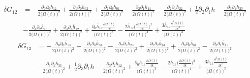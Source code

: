 \documentclass[10pt,letterpaper]{article}
\begin{document}
\begin{align}
	\delta G_{12} &=- \frac{\partial_{0}\partial_{0}\overline{h}_{12}}{2 \bigl(\Omega(t)\bigr)^2} + \frac{\partial_{1}\partial_{0}\overline{h}_{02}}{2 \bigl(\Omega(t)\bigr)^2} + \frac{\partial_{2}\partial_{0}\overline{h}_{01}}{2 \bigl(\Omega(t)\bigr)^2} -  \frac{\partial_{2}\partial_{1}\overline{h}_{11}}{2 \bigl(\Omega(t)\bigr)^2} -  \frac{\partial_{2}\partial_{1}\overline{h}_{22}}{2 \bigl(\Omega(t)\bigr)^2} + \tfrac{1}{2} \partial_{2}\partial_{1}h -  \frac{\partial_{3}\partial_{1}\overline{h}_{23}}{2 \bigl(\Omega(t)\bigr)^2}\\
& -  \frac{\partial_{3}\partial_{2}\overline{h}_{13}}{2 \bigl(\Omega(t)\bigr)^2} + \frac{\partial_{3}\partial_{3}\overline{h}_{12}}{2 \bigl(\Omega(t)\bigr)^2} + \frac{\partial_{0}\overline{h}_{12} \frac{\partial \Omega(t)}{\partial t}}{\bigl(\Omega(t)\bigr)^3} -  \frac{2 \overline{h}_{12} \bigl(\frac{\partial \Omega(t)}{\partial t}\bigr)^2}{\bigl(\Omega(t)\bigr)^4} + \frac{3 \overline{h}_{12} \frac{\partial^{2}\Omega(t)}{\partial t^{2}}}{\bigl(\Omega(t)\bigr)^3}
\end{align}
\begin{align}
	\delta G_{13} &=- \frac{\partial_{0}\partial_{0}\overline{h}_{13}}{2 \bigl(\Omega(t)\bigr)^2} + \frac{\partial_{1}\partial_{0}\overline{h}_{03}}{2 \bigl(\Omega(t)\bigr)^2} -  \frac{\partial_{2}\partial_{1}\overline{h}_{23}}{2 \bigl(\Omega(t)\bigr)^2} + \frac{\partial_{2}\partial_{2}\overline{h}_{13}}{2 \bigl(\Omega(t)\bigr)^2} + \frac{\partial_{3}\partial_{0}\overline{h}_{01}}{2 \bigl(\Omega(t)\bigr)^2} -  \frac{\partial_{3}\partial_{1}\overline{h}_{11}}{2 \bigl(\Omega(t)\bigr)^2} \\
&-  \frac{\partial_{3}\partial_{1}\overline{h}_{33}}{2 \bigl(\Omega(t)\bigr)^2} + \tfrac{1}{2} \partial_{3}\partial_{1}h -  \frac{\partial_{3}\partial_{2}\overline{h}_{12}}{2 \bigl(\Omega(t)\bigr)^2} + \frac{\partial_{0}\overline{h}_{13} \frac{\partial \Omega(t)}{\partial t}}{\bigl(\Omega(t)\bigr)^3} -  \frac{2 \overline{h}_{13} \bigl(\frac{\partial \Omega(t)}{\partial t}\bigr)^2}{\bigl(\Omega(t)\bigr)^4} + \frac{3 \overline{h}_{13} \frac{\partial^{2}\Omega(t)}{\partial t^{2}}}{\bigl(\Omega(t)\bigr)^3}
\end{align}
\end{document}
